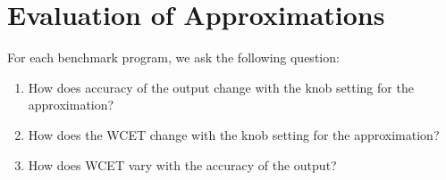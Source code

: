 \section{Evaluation of Approximations}
For each benchmark program, we ask the following question:
\begin{enumerate}
\item How does accuracy of the output change with the knob setting for the approximation?
\item How does the WCET change with the knob setting for the approximation?
\item How does WCET vary with the accuracy of the output?
\end{enumerate}














